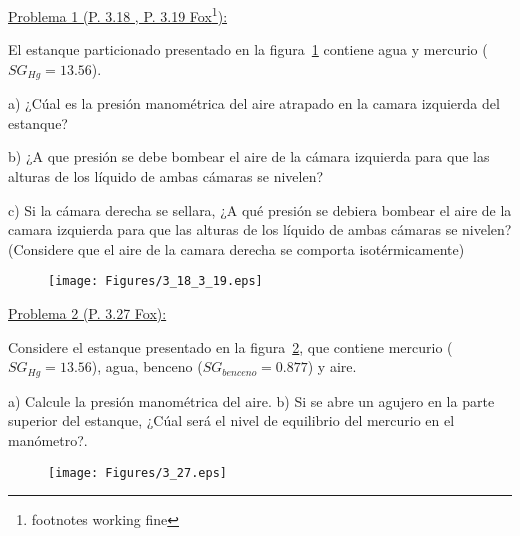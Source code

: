 \documentclass[11pt]{report}
\begin{document}

\vspace{1cm}


\vspace{1cm}

\underline {Problema 1 (P. 3.18 , P. 3.19 Fox\footnote{footnotes working fine}):}

\vspace{0.2cm}
El estanque particionado presentado en la figura~\ref{fig:fig1} contiene agua y mercurio ($SG_{Hg}=13.56$).

a) ¿C\'ual es la presi\'on manom\'etrica del aire atrapado en la camara izquierda del estanque?

b) ¿A que presi\'on se debe bombear el aire de la c\'amara izquierda para que las alturas de los l\'iquido de ambas c\'amaras se nivelen?

c) Si la c\'amara derecha se sellara, ¿A qu\'e presi\'on se debiera bombear el aire de la camara izquierda para que las alturas de los l\'iquido de ambas c\'amaras se nivelen? (Considere que el aire de la camara derecha se comporta isot\'ermicamente)

\begin{figure}[H]
\centering\texttt{[image: Figures/3\_18\_3\_19.eps]}
\caption{\label{fig:fig1} }
\end{figure}

\newpage

\underline {Problema 2 (P. 3.27 Fox):}

\vspace{0.2cm}

Considere el estanque presentado en la figura~\ref{fig:fig2}, que contiene mercurio ($SG_{Hg}=13.56$), agua, benceno ($SG_{benceno}=0.877$) y aire. 

a) Calcule la presi\'on manom\'etrica del aire. 
b) Si se abre un agujero en la parte superior del estanque, ¿C\'ual ser\'a el nivel de equilibrio del mercurio en el man\'ometro?.

\begin{figure}[H]
\centering\texttt{[image: Figures/3\_27.eps]}
\caption{\label{fig:fig2} }
\end{figure}
\end{document}
